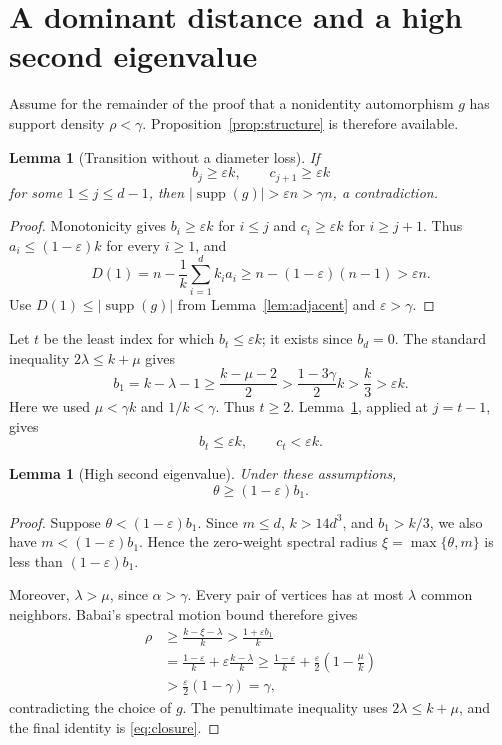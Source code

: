 \documentclass[11pt]{amsart}
\newtheorem{lemma}[theorem]{Lemma}
\theoremstyle{definition}
\newcommand{\supp}{\operatorname{supp}}
\newcommand{\eps}{\varepsilon}
\newcommand{\gam}{\gamma}
\begin{document}
\section{A dominant distance and a high second eigenvalue}
Assume for the remainder of the proof that a nonidentity automorphism $g$ has support density $\rho<\gam$.  Proposition~\ref{prop:structure} is therefore available.

\begin{lemma}[Transition without a diameter loss]\label{lem:transition}
If
\[
 b_j\ge\eps k,
 \qquad
 c_{j+1}\ge\eps k
\]
for some $1\le j\le d-1$, then $|\supp(g)|>\eps n>\gam n$, a contradiction.
\end{lemma}

\begin{proof}
Monotonicity gives $b_i\ge\eps k$ for $i\le j$ and $c_i\ge\eps k$ for $i\ge j+1$.  Thus $a_i\le(1-\eps)k$ for every $i\ge1$, and
\[
 D(1)=n-\frac1k\sum_{i=1}^{d}k_i a_i
 \ge n-(1-\eps)(n-1)>\eps n.
\]
Use $D(1)\le|\supp(g)|$ from Lemma~\ref{lem:adjacent} and $\eps>\gam$.
\end{proof}

Let $t$ be the least index for which $b_t\le\eps k$; it exists since $b_d=0$.  The standard inequality $2\lambda\le k+\mu$ gives
\[
 b_1=k-\lambda-1\ge\frac{k-\mu-2}{2}
 >\frac{1-3\gam}{2}k>\frac{k}{3}>\eps k.
\]
Here we used $\mu<\gam k$ and $1/k<\gam$.  Thus $t\ge2$.  Lemma~\ref{lem:transition}, applied at $j=t-1$, gives
\begin{equation}\label{eq:dominant}
 b_t\le\eps k,
 \qquad
 c_t<\eps k.
\end{equation}

\begin{lemma}[High second eigenvalue]\label{lem:hightheta}
Under these assumptions,
\[
 \theta\ge(1-\eps)b_1.
\]
\end{lemma}

\begin{proof}
Suppose $\theta<(1-\eps)b_1$.  Since $m\le d$, $k>14d^3$, and $b_1>k/3$, we also have $m<(1-\eps)b_1$.  Hence the zero-weight spectral radius $\xi=\max\{\theta,m\}$ is less than $(1-\eps)b_1$.

Moreover, $\lambda>\mu$, since $\alpha>\gam$.  Every pair of vertices has at most $\lambda$ common neighbors.  Babai's spectral motion bound \cite[Proposition~2.13]{PS} therefore gives
\begin{align*}
 \rho
 &\ge\frac{k-\xi-\lambda}{k}
 >\frac{1+\eps b_1}{k}\\
 &=\frac{1-\eps}{k}+\eps\frac{k-\lambda}{k}
 \ge\frac{1-\eps}{k}+\frac\eps2\left(1-\frac\mu k\right)\\
 &>\frac\eps2(1-\gam)=\gam,
\end{align*}
contradicting the choice of $g$.  The penultimate inequality uses $2\lambda\le k+\mu$, and the final identity is \eqref{eq:closure}.
\end{proof}
\end{document}
